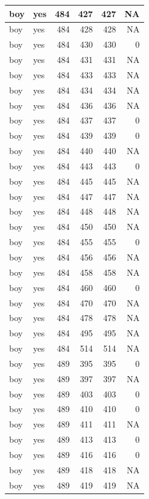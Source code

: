\documentclass[man]{apa6}
\begin{document}
\begin{tabular}{l|l|r|r|r|r}
\hline
boy & yes & 484 & 427 & 427 & NA\\
\hline
boy & yes & 484 & 428 & 428 & NA\\
\hline
boy & yes & 484 & 430 & 430 & 0\\
\hline
boy & yes & 484 & 431 & 431 & NA\\
\hline
boy & yes & 484 & 433 & 433 & NA\\
\hline
boy & yes & 484 & 434 & 434 & NA\\
\hline
boy & yes & 484 & 436 & 436 & NA\\
\hline
boy & yes & 484 & 437 & 437 & 0\\
\hline
boy & yes & 484 & 439 & 439 & 0\\
\hline
boy & yes & 484 & 440 & 440 & NA\\
\hline
boy & yes & 484 & 443 & 443 & 0\\
\hline
boy & yes & 484 & 445 & 445 & NA\\
\hline
boy & yes & 484 & 447 & 447 & NA\\
\hline
boy & yes & 484 & 448 & 448 & NA\\
\hline
boy & yes & 484 & 450 & 450 & NA\\
\hline
boy & yes & 484 & 455 & 455 & 0\\
\hline
boy & yes & 484 & 456 & 456 & NA\\
\hline
boy & yes & 484 & 458 & 458 & NA\\
\hline
boy & yes & 484 & 460 & 460 & 0\\
\hline
boy & yes & 484 & 470 & 470 & NA\\
\hline
boy & yes & 484 & 478 & 478 & NA\\
\hline
boy & yes & 484 & 495 & 495 & NA\\
\hline
boy & yes & 484 & 514 & 514 & NA\\
\hline
boy & yes & 489 & 395 & 395 & 0\\
\hline
boy & yes & 489 & 397 & 397 & NA\\
\hline
boy & yes & 489 & 403 & 403 & 0\\
\hline
boy & yes & 489 & 410 & 410 & 0\\
\hline
boy & yes & 489 & 411 & 411 & NA\\
\hline
boy & yes & 489 & 413 & 413 & 0\\
\hline
boy & yes & 489 & 416 & 416 & 0\\
\hline
boy & yes & 489 & 418 & 418 & NA\\
\hline
boy & yes & 489 & 419 & 419 & NA\\

\end{tabular}
\end{document}
